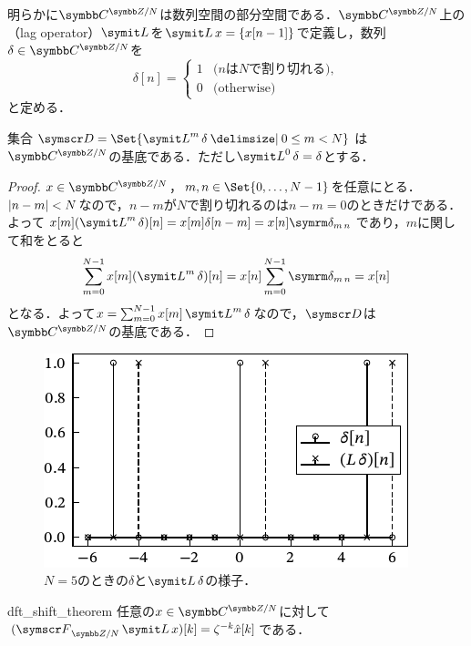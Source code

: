 \documentclass[../../main]{subfiles}
\begin{document}
明らかに\(\cycles{\numset{C}}{N}\)は数列空間の部分空間である．\(\cycles{\numset{C}}{N}\)上の（lag operator）\(\lagop\)を\(\lagop x=\seq{x[n-1]}\)で定義し，数列\(\delta\in\cycles{\numset{C}}{N}\)を
\[
  \delta[n] = \begin{cases}1 & \text{(\(n\)は\(N\)で割り切れる)},\\ 0 & \text{(otherwise)}\end{cases}
\]
と定める．

\begin{proposition}{}{}
  集合\(\basis{D}=\Set{\lagop^m\delta\given 0\leq m<N}\)は\(\cycles{\numset{C}}{N}\)の基底である．ただし\(\lagop^0\delta=\delta\)とする．
\end{proposition}

\begin{proof}
  \(x\in\cycles{\numset{C}}{N}\)，\(m,n\in\Set{0,\dots,N-1}\)を任意にとる．\(\lvert n-m\rvert<N\)なので，\(n-m\)が\(N\)で割り切れるのは\(n-m=0\)のときだけである．
  よって\(x[m](\lagop^m\delta)[n]=x[m]\delta[n-m]=x[n]\kdelta{m}{n}\)であり，\(m\)に関して和をとると
  \begin{equation}
    \label{equation:lagop_expansion}
    \sum_{m=0}^{N-1}x[m](\lagop^m\delta)[n] = x[n]\sum_{m=0}^{N-1}\kdelta{m}{n}
    = x[n]
  \end{equation}
  となる．よって\(x=\sum_{m=0}^{N-1}x[m]\lagop^m\delta\)なので，\(\basis{D}\)は\(\cycles{\numset{C}}{N}\)の基底である．
\end{proof}

\begin{figure}[htbp]
  \centering
  \includegraphics{figures/comb.pdf}
  \caption{\(N=5\)のときの\(\delta\)と\(\lagop\delta\)の様子．}
\end{figure}

\begin{proposition}{}{dft_shift_theorem}
  任意の\(x\in\cycles{\numset{C}}{N}\)に対して\((\dft{N}\lagop x)[k]=\zeta^{-k}\hat{x}[k]\)である．
\end{proposition}
\end{document}
